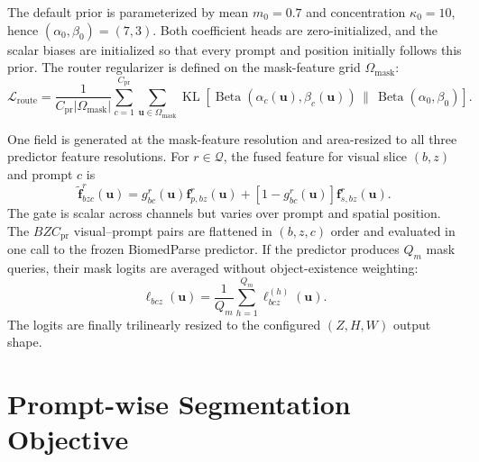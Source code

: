 \documentclass[10pt]{article}
\newcommand{\cL}{\mathcal{L}}
\newcommand{\KL}{\operatorname{KL}}
\begin{document}
The default prior is parameterized by mean $m_0=0.7$ and concentration
$\kappa_0=10$, hence $(\alpha_0,\beta_0)=(7,3)$.  Both coefficient heads are
zero-initialized, and the scalar biases are initialized so that every prompt and
position initially follows this prior.  The router regularizer is
defined on the mask-feature grid $\Omega_{\mathrm{mask}}$:
\begin{equation}
    \cL_{\mathrm{route}}
    =\frac{1}{C_{\mathrm{pr}}|\Omega_{\mathrm{mask}}|}
      \sum_{c=1}^{C_{\mathrm{pr}}}
      \sum_{\bm{u}\in\Omega_{\mathrm{mask}}}
      \KL\!\left[
        \operatorname{Beta}(\alpha_c(\bm{u}),\beta_c(\bm{u}))
        \,\|\,
        \operatorname{Beta}(\alpha_0,\beta_0)
      \right].
    \label{eq:route-kl}
\end{equation}

One field is generated at the mask-feature resolution and area-resized to all
three predictor feature resolutions.  For $r\in\mathcal{Q}$, the fused feature
for visual slice $(b,z)$ and prompt $c$ is
\begin{equation}
    \widetilde{\bm{f}}^{r}_{bzc}(\bm{u})
    =g^{r}_{bc}(\bm{u})\bm{f}^{r}_{p,bz}(\bm{u})
     +\left[1-g^{r}_{bc}(\bm{u})\right]
       \bm{f}^{r}_{s,bz}(\bm{u}).
    \label{eq:spatial-fusion}
\end{equation}
The gate is scalar across channels but varies over prompt and spatial position.
The $BZC_{\mathrm{pr}}$ visual--prompt pairs are flattened in $(b,z,c)$ order
and evaluated in one call to the frozen BiomedParse predictor.  If the predictor
produces $Q_m$
mask queries, their mask logits are averaged without object-existence weighting:
\begin{equation}
    \ell_{bcz}(\bm{u})
      =\frac{1}{Q_m}\sum_{h=1}^{Q_m}\ell^{(h)}_{bcz}(\bm{u}).
    \label{eq:query-average}
\end{equation}
The logits are finally trilinearly resized to the configured $(Z,H,W)$ output
shape.

\section{Prompt-wise Segmentation Objective}

\end{document}

